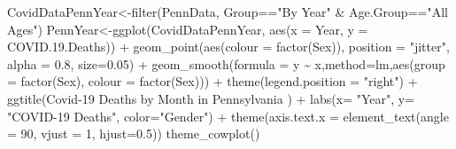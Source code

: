 \documentclass[
]{article}
\newenvironment{Shaded}{\begin{snugshade}}{\end{snugshade}}
\newcommand{\AttributeTok}[1]{\textcolor[rgb]{0.77,0.63,0.00}{#1}}
\newcommand{\DecValTok}[1]{\textcolor[rgb]{0.00,0.00,0.81}{#1}}
\newcommand{\FloatTok}[1]{\textcolor[rgb]{0.00,0.00,0.81}{#1}}
\newcommand{\FunctionTok}[1]{\textcolor[rgb]{0.00,0.00,0.00}{#1}}
\newcommand{\NormalTok}[1]{#1}
\newcommand{\OtherTok}[1]{\textcolor[rgb]{0.56,0.35,0.01}{#1}}
\newcommand{\SpecialCharTok}[1]{\textcolor[rgb]{0.00,0.00,0.00}{#1}}
\newcommand{\StringTok}[1]{\textcolor[rgb]{0.31,0.60,0.02}{#1}}
\begin{document}
\begin{Shaded}
\begin{Highlighting}[]
\NormalTok{CovidDataPennYear}\OtherTok{\textless{}{-}}\FunctionTok{filter}\NormalTok{(PennData, Group}\SpecialCharTok{==}\StringTok{"By Year"} \SpecialCharTok{\&}\NormalTok{ Age.Group}\SpecialCharTok{==}\StringTok{"All Ages"}\NormalTok{)}
\NormalTok{PennYear}\OtherTok{\textless{}{-}}\FunctionTok{ggplot}\NormalTok{(CovidDataPennYear, }\FunctionTok{aes}\NormalTok{(}\AttributeTok{x =}\NormalTok{ Year, }\AttributeTok{y =}\NormalTok{ COVID.}\FloatTok{19.}\NormalTok{Deaths)) }\SpecialCharTok{+}
  \FunctionTok{geom\_point}\NormalTok{(}\FunctionTok{aes}\NormalTok{(}\AttributeTok{colour =} \FunctionTok{factor}\NormalTok{(Sex)), }
             \AttributeTok{position =} \StringTok{"jitter"}\NormalTok{, }
             \AttributeTok{alpha =} \FloatTok{0.8}\NormalTok{,}
             \AttributeTok{size=}\FloatTok{0.05}\NormalTok{) }\SpecialCharTok{+}
  \FunctionTok{geom\_smooth}\NormalTok{(}\AttributeTok{formula =}\NormalTok{ y }\SpecialCharTok{\textasciitilde{}}\NormalTok{ x,}\AttributeTok{method=}\StringTok{\textquotesingle{}lm\textquotesingle{}}\NormalTok{,}\FunctionTok{aes}\NormalTok{(}\AttributeTok{group =} \FunctionTok{factor}\NormalTok{(Sex), }
                              \AttributeTok{colour =} \FunctionTok{factor}\NormalTok{(Sex))) }\SpecialCharTok{+} 
  \FunctionTok{theme}\NormalTok{(}\AttributeTok{legend.position =} \StringTok{"right"}\NormalTok{) }\SpecialCharTok{+} 
  \FunctionTok{ggtitle}\NormalTok{(}\StringTok{\textquotesingle{}Covid{-}19 Deaths by Month in Pennsylvania \textquotesingle{}}\NormalTok{) }\SpecialCharTok{+}
  \FunctionTok{labs}\NormalTok{(}\AttributeTok{x=} \StringTok{"Year"}\NormalTok{, }\AttributeTok{y=} \StringTok{"COVID{-}19 Deaths"}\NormalTok{, }\AttributeTok{color=}\StringTok{"Gender"}\NormalTok{) }\SpecialCharTok{+}
  \FunctionTok{theme}\NormalTok{(}\AttributeTok{axis.text.x =} \FunctionTok{element\_text}\NormalTok{(}\AttributeTok{angle =} \DecValTok{90}\NormalTok{, }\AttributeTok{vjust =} \DecValTok{1}\NormalTok{, }\AttributeTok{hjust=}\FloatTok{0.5}\NormalTok{))}
  \FunctionTok{theme\_cowplot}\NormalTok{()}
\end{Highlighting}
\end{Shaded}
\end{document}
